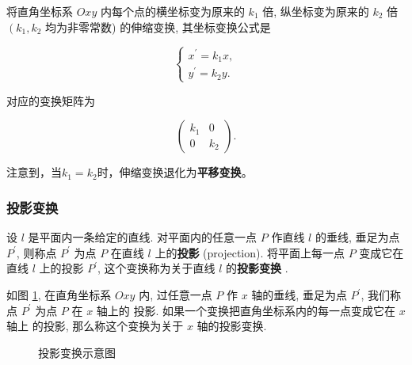 \documentclass[lang=cn,newtx,10pt,scheme=chinese]{elegantbook}
\begin{document}
\begin{exercise}

    将直角坐标系 $O x y$ 内每个点的横坐标变为原来的 $k_1$ 倍, 纵坐标变为原来的 $k_2$ 倍 $\left(k_1, k_2\right.$ 均为非零常数) 的伸缩变换, 其坐标变换公式是
    
    \begin{equation}
        \left\{\begin{array}{l}
    x^{\prime}=k_1 x, \\
    y^{\prime}=k_2 y .
    \end{array}\right.
    \label{伸缩变换一般表达式}
    \end{equation}
    
    对应的变换矩阵为 
    
    \begin{equation}
    \left(\begin{array}{cc}k_1 & 0 \\ 0 & k_2\end{array}\right).
    \label{伸缩变换一般矩阵}
    \end{equation}

\end{exercise}

注意到，当$k_1=k_2$时，伸缩变换退化为\textcolor{third}{\bf 平移变换}。


\subsubsection{投影变换}
\label{subsubsec:投影变换}

设 $l$ 是平面内一条给定的直线. 对平面内的任意一点 $P$ 作直线 $l$ 的垂线, 垂足为点 $P^{\prime}$, 则称点 $P^{\prime}$ 为点 $P$ 在直线 $l$ 上的\textcolor{third}{\bf 投影} (projection). 将平面上每一点 $P$ 变成它在直线 $l$ 上的投影 $P^{\prime}$, 这个变换称为关于直线 $l$ 的\textcolor{third}{\bf 投影变换}  .

如图 \ref{fig:投影变换}, 在直角坐标系 $O x y$ 内, 过任意一点 $P$ 作 $x$ 轴的垂线, 垂足为点 $P^{\prime}$, 我们称点 $P^{\prime}$ 为点 $P$ 在 $x$ 轴上的  投影. 如果一个变换把直角坐标系内的每一点变成它在 $x$ 轴上 的投影, 那么称这个变换为关于 $x$ 轴的投影变换.

\begin{figure}[h]
\centering
{}
\caption{投影变换示意图\label{fig:投影变换}}
\end{figure}
\end{document}
